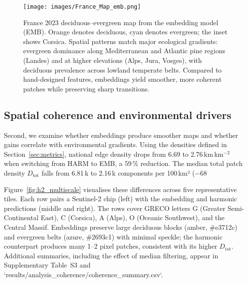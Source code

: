 \documentclass[utf8]{FrontiersinHarvard}
\begin{document}
\begin{figure}[H]
    \centering
    \texttt{[image: images/France\_Map\_emb.png]}
    \caption{France 2023 deciduous--evergreen map from the embedding model (EMB). Orange denotes deciduous, cyan denotes evergreen; the inset shows Corsica. Spatial patterns match major ecological gradients: evergreen dominance along Mediterranean and Atlantic pine regions (Landes) and at higher elevations (Alps, Jura, Vosges), with deciduous prevalence across lowland temperate belts. Compared to hand-designed features, embeddings yield smoother, more coherent patches while preserving sharp transitions.}
    \label{fig:national_map}
\end{figure}

\subsection{Spatial coherence and environmental drivers}
Second, we examine whether embeddings produce smoother maps and whether gains correlate with environmental gradients. Using the densities defined in Section~\ref{sec:metrics}, national edge density drops from 6.69 to 2.76\,km\,km\(^{-2}\) when switching from HARM to EMB, a 59\,\% reduction. The median total patch density \(D_{\text{tot}}\) falls from 6.81\,k to 2.16\,k components per 100\,km² (−68\,%

Figure~\ref{fig:h2_multiscale} visualises these differences across five representative tiles. Each row pairs a Sentinel-2 chip (left) with the embedding and harmonic predictions (middle and right). The rows cover GRECO letters G (Greater Semi-Continental East), C (Corsica), A (Alps), O (Oceanic Southwest), and the Central Massif. Embeddings preserve large deciduous blocks (amber, \#e3712c) and evergreen belts (azure, \#2693c1) with minimal speckle; the harmonic counterpart produces many 1–2 pixel patches, consistent with its higher \(D_{\text{tot}}\). Additional summaries, including the effect of median filtering, appear in Supplementary Table~S3 and `results/analysis_coherence/coherence_summary.csv`.
\end{document}
